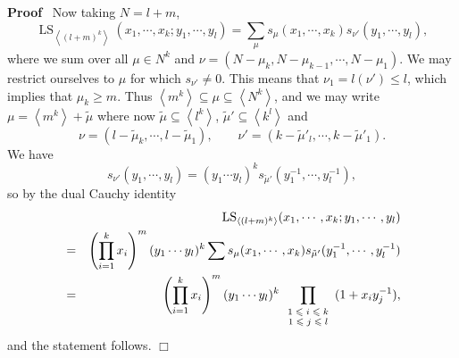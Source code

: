 \documentclass[11pt]{amsart}
\newcommand{\tmop}[1]{\ensuremath{\operatorname{#1}}}
\renewenvironment{proof}{
\noindent\textbf{Proof}\ }{\hspace*{\fill}
\begin{math}\Box\end{math}\medskip}
\newcommand{\tmscript}[1]{\text{\scriptsize $#1$}}
\begin{document}
\begin{proof}
Now taking $N = l + m$,
\[ \tmop{LS}_{\left\langle ( l + m )^k \right\rangle} ( x_1, \cdots, x_k ;
    y_1, \cdots, y_l ) = \sum_{\mu} s_{\mu} ( x_1, \cdots, x_k ) s_{\nu'} (
    y_1, \cdots, y_l ), \]
where we sum over all $\mu \in N^k$ and $\nu = ( N - \mu_k, N -
\mu_{k - 1}, \cdots, N - \mu_1 )$. We may restrict ourselves to
$\mu$ for which $s_{\nu'} \neq 0$. This means that $\nu_1 = l (
\nu' ) \leqslant l$, which implies that $\mu_k \geqslant m$. Thus
$\left\langle m^k \right\rangle \subseteq \mu \subseteq
\left\langle N^k \right\rangle$, and we may write $\mu =
\left\langle m^k \right\rangle + \tilde{\mu}$ where now
$\tilde{\mu} \subseteq \left\langle l^k \right\rangle$,
$\tilde{\mu}' \subseteq \left\langle k^l \right\rangle$ and
\[ \nu = ( l - \tilde{\mu}_k, \cdots, l - \tilde{\mu}_1 ), \hspace{2em} \nu'
    = ( k - \tilde{\mu}'_l, \cdots, k - \tilde{\mu}'_1 ) . \]
We have
\[ s_{\nu'} ( y_1, \cdots, y_l ) = ( y_1 \cdots y_l )^k s_{\tilde{\mu}'} (
    y_1^{- 1}, \cdots, y_l^{- 1} ), \]
so by the dual Cauchy identity
\begin{eqnarray*}
   &  & \tmop{LS}_{\left\langle ( l + m )^k \right\rangle} ( x_1, \cdots,
   x_k ; y_1, \cdots, y_l )\\
   & = & \left( \prod_{i = 1}^k x_i \right)^m ( y_1 \cdots y_l )^k \sum
   s_{\mu} ( x_1, \cdots, x_k ) s_{\tilde{\mu}'} ( y_1^{- 1}, \cdots, y_l^{-
   1} )\\
   & = & \left( \prod_{i = 1}^k x_i \right)^m ( y_1 \cdots y_l )^k
   \prod_{\tmscript{\begin{array}{c}
     1 \leqslant i \leqslant k\\
     1 \leqslant j \leqslant l
   \end{array}}} ( 1 + x_i y_j^{- 1} ),
\end{eqnarray*}
and the statement follows.
\end{proof}
\end{document}
